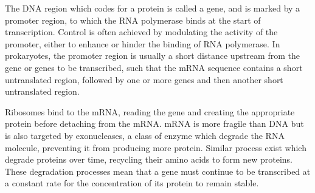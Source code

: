 \documentclass[twoside,a4paper]{article}
\begin{document}
\begin{multicols}{2}
The DNA region which codes for a protein is called a gene, and is marked by a
promoter region, to which the RNA polymerase binds at the start of
transcription.
Control is often achieved by modulating the activity of the promoter, either to
enhance or hinder the binding of RNA polymerase.
In prokaryotes, the promoter region is usually a short distance upstream from
the gene or genes to be transcribed, such that the mRNA sequence contains a
short untranslated region, followed by one or more genes and then another short
untranslated region.

Ribosomes bind to the mRNA, reading the gene and creating the appropriate
protein before detaching from the mRNA.
mRNA is more fragile than DNA but is also targeted by exonucleases, a class of
enzyme which degrade the RNA molecule, preventing it from producing more
protein.
Similar process exist which degrade proteins over time, recycling their amino
acids to form new proteins.
These degradation processes mean that a gene must continue to be transcribed at
a constant rate for the concentration of its protein to remain stable.








\end{multicols}
\end{document}
